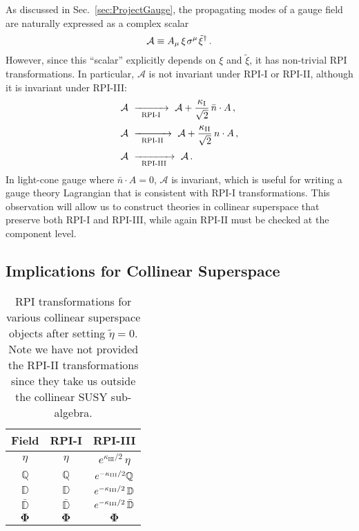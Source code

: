 \documentclass[12pt,document,nofootinbib,superscriptaddress,onecolumn,preprintnumbers,balancelastpage]{article}
\newcommand{\rpiiii}{{\kappa_\text{III}}}
\newcommand{\s}{\hspace{0.8pt}}
\newcommand{\RPIi}{\,\,\xrightarrow[\hspace{5pt}\text{RPI-I}\hspace{5pt}]{}\,\,}
\newcommand{\RPIii}{\,\,\xrightarrow[\hspace{5pt}\text{RPI-II}\hspace{5pt}]{}\,\,}
\newcommand{\RPIiii}{\,\,\xrightarrow[\hspace{5pt}\text{RPI-III}\hspace{5pt}]{}\,\,}
\DeclareRobustCommand{\Sec}[1]{Sec.~\ref{#1}}
\newcommand{\D}{\mathbb{D}}
\newcommand{\Q}{\mathbb{Q}}
\newcommand{\bPhi}{\boldsymbol{\Phi}}
\begin{document}
\begin{spacing}{1.2}
As discussed in \Sec{sec:ProjectGauge}, the propagating modes of a gauge field are naturally expressed as a complex scalar 
%
\begin{equation}
\label{eq:scriptAdef}
\mathcal{A} \equiv A_\mu \, \xi\s \sigma^\mu\s \tilde{\xi}^\dagger\,.
\end{equation}
%
However, since this ``scalar'' explicitly depends on $\xi$ and $\tilde{\xi}$, it has non-trivial RPI transformations.  
%
In particular, $\mathcal{A}$ is not invariant under RPI-I or RPI-II, although it is invariant under RPI-III:
\begin{align}
\mathcal{A} &\RPIi \mathcal{A} + \frac{\kappa_{\rm I}}{\sqrt{2}} \, \bar{n}\cdot A\,,\\[2pt]
\mathcal{A} &\RPIii \mathcal{A} + \frac{\kappa_{\rm II}}{\sqrt{2}} \, n\cdot A\,,\\[2pt]
\mathcal{A} &\RPIiii \mathcal{A} \,.
\end{align}
%
In light-cone gauge where $\bar{n}\cdot A = 0$, $\mathcal{A}$ is invariant, which is useful for writing a gauge theory Lagrangian that is consistent with RPI-I transformations.
%
This observation will allow us to construct theories in collinear superspace that preserve both RPI-I and RPI-III, while again RPI-II must be checked at the component level. 


\subsection{Implications for Collinear Superspace}
\label{subsec:ImpCollSup}

\begin{table}[t!]
\renewcommand{\arraystretch}{1.8}
\setlength{\arrayrulewidth}{.3mm}
\centering
\setlength{\tabcolsep}{0.95 em}
\begin{tabular}{ |c || c | c|}
    \hline
 Field &  RPI-I &   RPI-III   \\ \hline \hline
     $\eta $  & $\eta$   &    $ e^{\rpiiii/2}\, \eta $ \\
     \hline
      $\Q$ & $\Q$& $e^{-\kappa_{\rm III}/2}  \Q$ \\
     \hline
      $\D$ &$\D$ & $e^{-\kappa_{\rm III}/2} \,\D$ \\
  $\bar{\D}$ & $\bar{\D}$ & $e^{-\kappa_{\rm III}/2} \,\bar{\D}$ \\
  \hline
$\bPhi$  & $\bPhi$   &  $\bPhi$    \\
\hline
\end{tabular} 
\caption{\small{RPI transformations for various collinear superspace objects after setting $\tilde{\eta} = 0$.  Note we have not provided the RPI-II transformations since they take us outside the collinear SUSY sub-algebra. }
}
\label{table:RPI-superfields}
\end{table}


\end{spacing}
\end{document}
